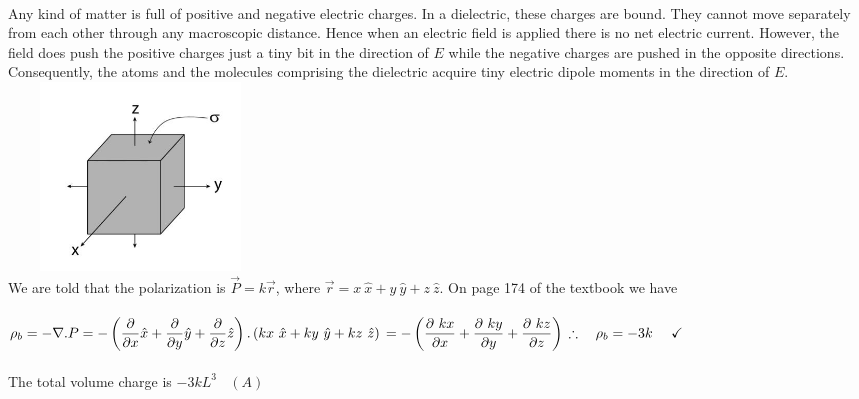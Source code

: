 \documentclass[fleqn]{article}
\begin{document}
\begin{enumerate}
      \textcolor{hwColor}{
        \\
        Any kind of matter is full of positive and negative electric charges. In a dielectric, these charges are bound. They cannot 
        move separately from each other through any macroscopic distance. Hence when an electric field is applied there is no net electric
        current. However, the field does push the positive charges just a tiny bit in the direction of $E$ while the negative
        charges are pushed in the opposite directions. Consequently, the atoms and the molecules
        comprising the dielectric acquire tiny electric dipole moments in the direction of $E$.
        \\
        \includegraphics[height=5cm, width=7cm]{4.JPG}
        \\
        We are told that the polarization is $\overrightarrow{P}=k \overrightarrow{r}$, where 
        $\overrightarrow{r}=x ~ \hat{x}+y ~ \hat{y}+z ~ \hat{z}$. On page 174 of the textbook we have
        \\
        \\
        $
          \rho_b=-\nabla . P=-\left(
            \dfrac{\partial}{\partial x}\hat{x}+\dfrac{\partial}{\partial y}\hat{y}+\dfrac{\partial}{\partial z}\hat{z}
          \right).\left(
            kx ~ \hat{x}+ky ~ \hat{y}+kz ~ \hat{z}
          \right)
          \\
          \\
          \\
          =-\left(
            \dfrac{\partial ~ kx}{\partial x}+\dfrac{\partial ~ ky}{\partial y}+\dfrac{\partial ~ kz}{\partial z}
          \right)
          \\
          \\
          \\
          \therefore ~~~ \rho_b=-3k ~~~~ \checkmark
        $
        \\
        \\
        The total volume charge is $-3kL^3 ~~~~ (A)$
        \\
}
\end{enumerate}
\end{document}
